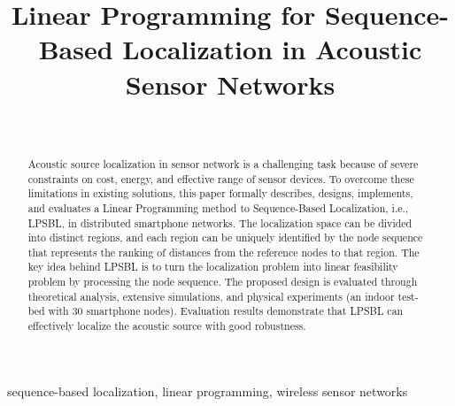 \documentclass[journal]{IEEEtran}
\begin{document}
\title {Linear Programming for Sequence-Based Localization in Acoustic Sensor Networks}
\author {\\
        }


\maketitle
\thispagestyle{empty}
\pagestyle{empty}



\begin{abstract}
Acoustic source localization in sensor network is a challenging task because of severe constraints on cost, energy, and effective range of sensor devices. 
To overcome these limitations in existing solutions, this paper formally describes, designs, implements, and evaluates a Linear Programming method to Sequence-Based Localization, i.e., LPSBL, in distributed smartphone networks. 
The localization space can be divided into distinct regions, and each region can be uniquely identified by the node sequence that represents the ranking of distances from the reference nodes to that region. 
The key idea behind LPSBL is to turn the localization problem into linear feasibility problem by processing the node sequence. 
The proposed design is evaluated through theoretical analysis, extensive simulations, and physical experiments (an indoor test-bed with 30 smartphone nodes). 
Evaluation results demonstrate that LPSBL can effectively localize the acoustic source with good robustness.
\end{abstract}

\begin{IEEEkeywords}
sequence-based localization, linear programming, wireless sensor networks
\end{IEEEkeywords}



\IEEEpeerreviewmaketitle











\end{document}
